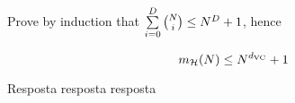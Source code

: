 \begin{enunciado}{5}
    Prove by induction that $\sum\limits_{i=0}^{D} {{N} \choose {i}} \le N^D + 1$, hence 
    
    $$ m_{\mathcal{H}}(N) \le N^{d_{\text{VC}}} + 1 $$
\end{enunciado}

Resposta resposta resposta